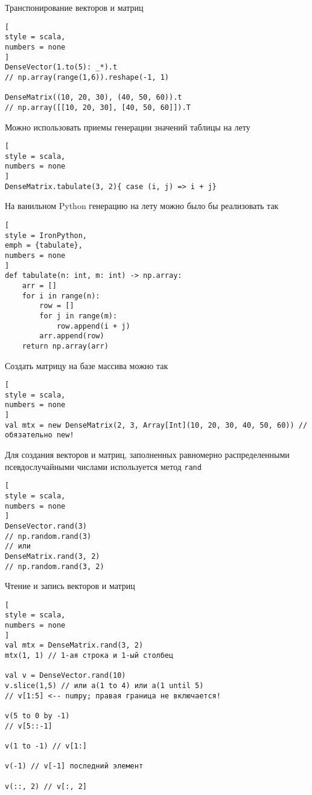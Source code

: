 \documentclass[%
	11pt,
	a4paper,
	utf8,
		]{article}
\begin{document}
Транспонирование векторов и матриц
\begin{lstlisting}[
style = scala,
numbers = none	
]
DenseVector(1.to(5): _*).t
// np.array(range(1,6)).reshape(-1, 1)

DenseMatrix((10, 20, 30), (40, 50, 60)).t
// np.array([[10, 20, 30], [40, 50, 60]]).T
\end{lstlisting}

Можно использовать приемы генерации значений таблицы на лету
\begin{lstlisting}[
style = scala,
numbers = none	
]
DenseMatrix.tabulate(3, 2){ case (i, j) => i + j}
\end{lstlisting}

На ванильном Python генерацию на лету можно было бы реализовать так
\begin{lstlisting}[
style = IronPython,
emph = {tabulate},
numbers = none	
]
def tabulate(n: int, m: int) -> np.array:
    arr = []
    for i in range(n):
        row = []
        for j in range(m):
            row.append(i + j)
        arr.append(row)
    return np.array(arr)
\end{lstlisting}

Создать матрицу на базе массива можно так
\begin{lstlisting}[
style = scala,
numbers = none	
]
val mtx = new DenseMatrix(2, 3, Array[Int](10, 20, 30, 40, 50, 60)) // обязательно new!
\end{lstlisting}

Для создания векторов и матриц, заполненных равномерно распределенными псевдослучайными числами используется метод \texttt{rand}
\begin{lstlisting}[
style = scala,
numbers = none	
]
DenseVector.rand(3)
// np.random.rand(3)
// или
DenseMatrix.rand(3, 2)
// np.random.rand(3, 2)
\end{lstlisting}

Чтение и запись векторов и матриц
\begin{lstlisting}[
style = scala,
numbers = none	
]
val mtx = DenseMatrix.rand(3, 2)
mtx(1, 1) // 1-ая строка и 1-ый столбец

val v = DenseVector.rand(10)
v.slice(1,5) // или a(1 to 4) или a(1 until 5)
// v[1:5] <-- numpy; правая граница не включается!

v(5 to 0 by -1)
// v[5::-1]

v(1 to -1) // v[1:]

v(-1) // v[-1] последний элемент

v(::, 2) // v[:, 2]
\end{lstlisting}
\end{document}
